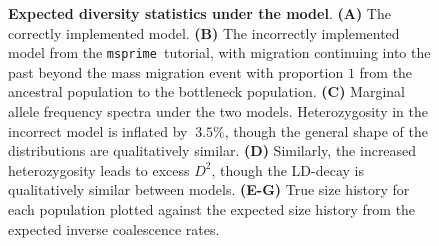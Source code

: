 \documentclass{article}
\newcommand{\msprime}[0]{\texttt{msprime}}
\begin{document}
\pagebreak

\begin{figure}[ht]
\begin{center}
\caption{\textbf{Expected diversity statistics under the \citet{gutenkunst2009inferring} model}.
    \textbf{(A)} The correctly implemented model.
    \textbf{(B)} The incorrectly implemented model from the \msprime\ tutorial, with migration continuing
    into the past beyond the mass migration event with proportion $1$ from the ancestral population
    to the bottleneck population.
    \textbf{(C)} Marginal allele frequency spectra under the two models. Heterozygosity in the incorrect model
    is inflated by $~3.5\%$, though the general shape of the distributions are qualitatively similar.
    \textbf{(D)} Similarly, the increased heterozygosity leads to excess $D^2$, though the LD-decay is
    qualitatively similar between models.
    \textbf{(E-G)} True size history for each population plotted against the expected size history from
    the expected inverse coalescence rates.
}
\label{fig:ooa_stats}
\end{center}
\end{figure}
\end{document}
